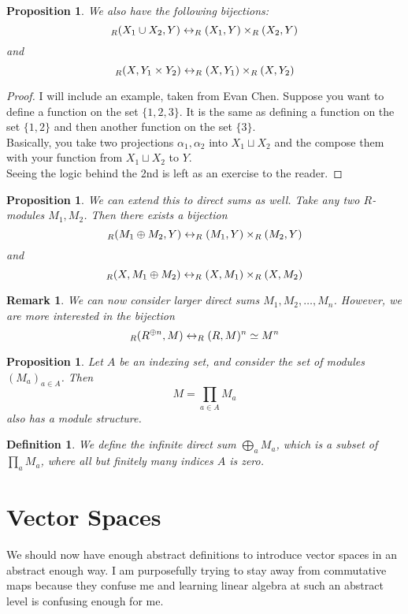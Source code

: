 \documentclass{article}
\theoremstyle{norm}
\newtheorem{df}[thm]{Definition}
\newtheorem{rem}[thm]{Remark}
\newtheorem{prop}[thm]{Proposition}
\let\hom\relax
\DeclareMathOperator{\hom}{Hom}
\begin{document}
\begin{prop}
We also have the following bijections:
\[ \hom_R(X_1 \cup X_2, Y) \leftrightarrow \hom_R(X_1, Y) \times
\hom_R(X_2, Y) \]
and
\[ \hom_R(X, Y_1 \times Y_2) \leftrightarrow \hom_R(X, Y_1) \times
\hom_R(X, Y_2) \]
\end{prop}
\begin{proof}
I will include an example, taken from Evan Chen. Suppose you want to
define a function on the set $\lbrace 1, 2, 3 \rbrace$. It is the same
as defining a function on the set $\lbrace 1, 2 \rbrace$ and then
another function on the set $\lbrace 3 \rbrace$. \\
Basically, you take two projections $\alpha_1, \alpha_2$ into $X_1
\sqcup X_2$ and the compose them with your function from $X_1 \sqcup
X_2$ to $Y$. \\
Seeing the logic behind the 2nd is left as an exercise to the reader.
\end{proof}

\begin{prop}
We can extend this to direct sums as well. Take any two $R$-modules
$M_1, M_2$. Then there exists a bijection
\[ \hom_R(M_1 \oplus M_2, Y) \leftrightarrow \hom_R(M_1, Y) \times
\hom_R(M_2, Y) \]
and
\[ \hom_R(X, M_1 \oplus M_2) \leftrightarrow \hom_R(X, M_1) \times
\hom_R(X, M_2) \]
\end{prop}

\begin{rem}
We can now consider larger direct sums $M_1, M_2, \dots, M_n$. However,
we are more interested in the bijection
\[ \hom_R(R^{\oplus n}, M) \leftrightarrow \hom_R(R, M)^n \simeq M^n \]
\end{rem}

\begin{prop}
Let $A$ be an indexing set, and consider the set of modules $(M_a)_{a
\in A}$. Then
\[ M = \prod_{a \in A} M_a \]
also has a module structure.
\end{prop}

\begin{df}
We define the infinite direct sum $\bigoplus_a M_a$, which is a subset
of $\prod_a M_a$, where all but finitely many indices $A$ is zero.
\end{df}

\section{Vector Spaces}
We should now have enough abstract definitions to introduce vector
spaces in an abstract enough way. I am purposefully trying to stay away
from commutative maps because they confuse me and learning linear
algebra at such an abstract level is confusing enough for me.
\end{document}

